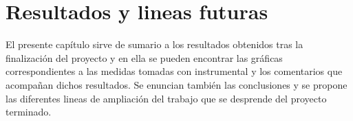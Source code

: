 \chapter{Resultados y lineas futuras}
El presente capítulo sirve de sumario a los resultados obtenidos tras la finalización del proyecto y en ella se pueden encontrar
las gráficas correspondientes a las medidas tomadas con instrumental y los comentarios que acompañan dichos resultados. Se enuncian
también las conclusiones y se propone las diferentes lineas de ampliación del trabajo que se desprende del proyecto terminado.
